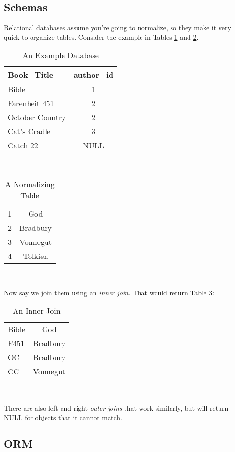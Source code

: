 \documentclass[12pt,letter]{article}
\begin{document}
\subsection{Schemas}
Relational databases assume you're going to normalize, so they make it
very quick to organize tables. Consider the example in Tables
\ref{aDatabase} and \ref{aNormalizer}.

\begin{table}[htbp]\centering
 \caption{An Example Database}
\label{aDatabase}
\begin{tabular}{l|c}\hline
Book\_Title & author\_id \\
\hline
Bible & 1 \\
Farenheit 451 & 2\\
October Country & 2\\
Cat's Cradle & 3 \\
Catch 22 & NULL \\
\end{tabular} \\
\end{table}

\begin{table}[htbp]\centering
 \caption{A Normalizing Table}
\label{aNormalizer}
\begin{tabular}{l|c}\hline
1 & God \\
2 & Bradbury \\
3 & Vonnegut \\
4 & Tolkien \\
\hline
\end{tabular} \\
\end{table}

Now say we join them using an \emph{inner join}. That would return
Table \ref{innerjoin}:
\begin{table}[h!]\centering
 \caption{An Inner Join}
\label{innerjoin}
\begin{tabular}{l|c}\hline
Bible & God \\
F451 & Bradbury \\
OC & Bradbury \\
CC & Vonnegut \\
\hline
\end{tabular} \\
\end{table}
There are also left and right \emph{outer joins} that work similarly,
but will return NULL for objects that it cannot match.

\subsection{ORM}
\end{document}
